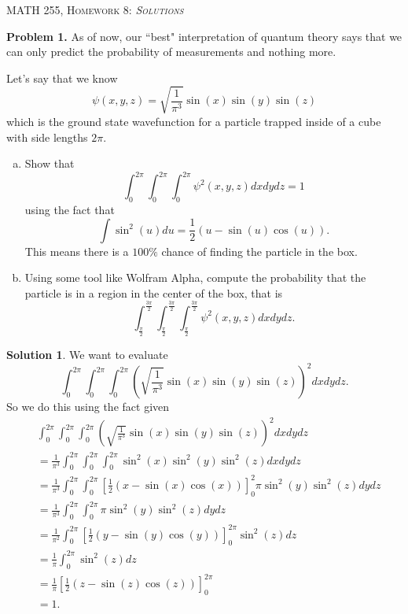 \documentclass[12pt]{report} %
\theoremstyle{definition}
\newtheorem{solution}{Solution}
\begin{document}
\begin{center}
   \textsc{\large MATH 255, Homework 8: \emph{Solutions}}\\
\end{center}
\vspace{.5cm}

\noindent\textbf{Problem 1.} As of now, our ``best" interpretation of quantum theory says that we can only predict the probability of measurements and nothing more.  

Let's say that we know 
\[
\psi(x,y,z) = \sqrt{\frac{1}{\pi^3}}\sin (x) \sin (y) \sin(z)
\]
which is the ground state wavefunction for a particle trapped inside of a cube with side lengths $2\pi$. 
\begin{enumerate}[(a)]
    \item Show that
    \[
    \int_0^{2\pi} \int_0^{2\pi} \int_0^{2\pi} \psi^2(x,y,z)dxdydz =1
    \]
    using the fact that
    \[
    \int \sin^2(u)du = \frac{1}{2}(u-\sin(u)\cos(u)).
    \]
    This means there is a $100\%$ chance of finding the particle in the box.
    \item Using some tool like Wolfram Alpha, compute the probability that the particle is in a region in the center of the box, that is
    \[
    \int_{\frac{\pi}{2}}^{\frac{3\pi}{2}}\int_{\frac{\pi}{2}}^{\frac{3\pi}{2}}\int_{\frac{\pi}{2}}^{\frac{3\pi}{2}} \psi^2(x,y,z)dxdydz.
    \]
\end{enumerate}
\begin{solution}
We want to evaluate
\[
\int_0^{2\pi} \int_0^{2\pi} \int_0^{2\pi} \left(\sqrt{\frac{1}{\pi^3}} \sin(x)\sin(y)\sin(z)\right)^2dxdydz.
\]
So we do this using the fact given
\begin{align*}
    &\int_0^{2\pi}\int_0^{2\pi}\int_0^{2\pi} \left(\sqrt{\frac{1}{\pi^3}} \sin(x)\sin(y)\sin(z)\right)^2dxdydz\\ &= \frac{1}{\pi^3} \int_0^{2\pi}\int_0^{2\pi}\int_0^{2\pi} \sin^2(x)\sin^2(y)\sin^2(z)dxdydz\\
    &= \frac{1}{\pi^3} \int_0^{2\pi}\int_0^{2\pi} \left[\frac{1}{2}(x-\sin(x)\cos(x))\right]_0^2\pi \sin^2(y)\sin^2(z)dydz\\
    &= \frac{1}{\pi^3}\int_0^{2\pi} \int_0^{2\pi} \pi \sin^2(y)\sin^2(z)dydz\\
    &= \frac{1}{\pi^2} \int_0^{2\pi} \left[ \frac{1}{2}(y - \sin(y)\cos(y))\right]_0^{2\pi} \sin^2(z)dz\\
    &= \frac{1}{\pi} \int_0^{2\pi} \sin^2(z)dz\\
    &= \frac{1}{\pi} \left[\frac{1}{2}(z-\sin(z)\cos(z))\right]_0^{2\pi}\\
    &=1.
\end{align*}
\end{solution}
\vspace*{.5cm}
\end{document}
